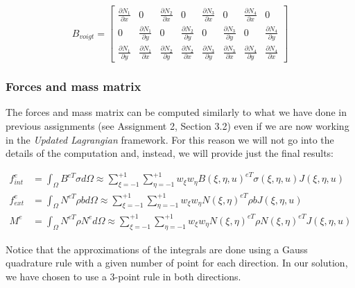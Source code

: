 \begin{equation}
    B_{voigt} = \begin{bmatrix}
        \frac{\partial N_1}{\partial x} & 0                               & \frac{\partial N_2}{\partial x} & 0                               & \frac{\partial N_3}{\partial x} & 0                               & \frac{\partial N_4}{\partial x} & 0                               \\
        0                               & \frac{\partial N_1}{\partial y} & 0                               & \frac{\partial N_2}{\partial y} & 0                               & \frac{\partial N_3}{\partial y} & 0                               & \frac{\partial N_4}{\partial y} \\
        \frac{\partial N_1}{\partial y} & \frac{\partial N_1}{\partial x} & \frac{\partial N_2}{\partial y} & \frac{\partial N_2}{\partial x} & \frac{\partial N_3}{\partial y} & \frac{\partial N_3}{\partial x} & \frac{\partial N_4}{\partial y} & \frac{\partial N_4}{\partial x}
    \end{bmatrix}
\end{equation}



\subsubsection{Forces and mass matrix}
\label{subsubsec:forces_and_mass_matrix}

The forces and mass matrix can be computed similarly to what we have done in previous assignments (see Assignment 2, Section 3.2) even if we are now working in the \textit{Updated Lagrangian} framework.
For this reason we will not go into the details of the computation and, instead, we will provide just the final results\footnotemark[1]:

\begin{align}
    f_{int}^e & = \int_{\Omega} B^{eT} \sigma d\Omega    \approx  \sum_{\xi = -1}^{+1} \sum_{\eta = -1}^{+1} w_{\xi} w_{\eta} B(\xi, \eta, u)^{eT} \sigma(\xi, \eta, u) J(\xi, \eta, u) \\
    f_{ext}^e & = \int_{\Omega} N^{eT} \rho b d\Omega         \approx  \sum_{\xi = -1}^{+1} \sum_{\eta = -1}^{+1} w_{\xi} w_{\eta} N(\xi, \eta)^{eT} \rho b J(\xi, \eta, u)             \\
    M^e       & = \int_{\Omega} N^{eT} \rho N^e d\Omega \approx \sum_{\xi = -1}^{+1} \sum_{\eta = -1}^{+1} w_{\xi} w_{\eta} N(\xi, \eta)^{eT} \rho N(\xi, \eta)^{eT} J(\xi, \eta, u)
\end{align}

Notice that the approximations of the integrals are done using a Gauss quadrature rule with a given number of point for each direction.
In our solution, we have chosen to use a 3-point rule in both directions.

